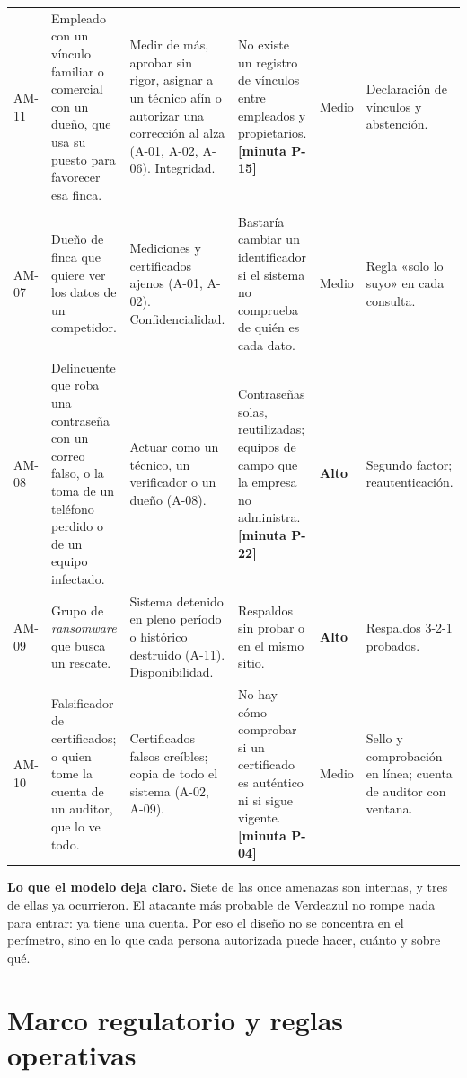\documentclass[11pt,letterpaper]{article}
\newcommand{\cab}[1]{\textbf{\rmfamily #1}}
\newcommand{\resp}[1]{\textrm{\footnotesize\bfseries [minuta #1]}}
\begin{document}
{\begin{longtable}{@{}L{1.25cm} L{3.3cm} L{3.8cm} L{3.4cm} L{1.0cm} L{2.6cm}@{}}
AM-11 & Empleado con un vínculo familiar o comercial con un dueño, que usa su puesto para favorecer esa finca. & Medir de más, aprobar sin rigor, asignar a un técnico afín o autorizar una corrección al alza (A-01, A-02, A-06). Integridad. & No existe un registro de vínculos entre empleados y propietarios. \resp{P-15} & Medio & Declaración de vínculos y abstención. \\
\addlinespace[4pt]
\multicolumn{6}{@{}l}{\cab{Amenazas externas}} \\
\addlinespace[2pt]
AM-07 & Dueño de finca que quiere ver los datos de un competidor. & Mediciones y certificados ajenos (A-01, A-02). Confidencialidad. & Bastaría cambiar un identificador si el sistema no comprueba de quién es cada dato. & Medio & Regla «solo lo suyo» en cada consulta. \\
AM-08 & Delincuente que roba una contraseña con un correo falso, o la toma de un teléfono perdido o de un equipo infectado. & Actuar como un técnico, un verificador o un dueño (A-08). & Contraseñas solas, reutilizadas; equipos de campo que la empresa no administra. \resp{P-22} & \textbf{Alto} & Segundo factor; reautenticación. \\
AM-09 & Grupo de \emph{ransomware} que busca un rescate. & Sistema detenido en pleno período o histórico destruido (A-11). Disponibilidad. & Respaldos sin probar o en el mismo sitio. & \textbf{Alto} & Respaldos 3-2-1 probados. \\
AM-10 & Falsificador de certificados; o quien tome la cuenta de un auditor, que lo ve todo. & Certificados falsos creíbles; copia de todo el sistema (A-02, A-09). & No hay cómo comprobar si un certificado es auténtico ni si sigue vigente. \resp{P-04} & Medio & Sello y comprobación en línea; cuenta de auditor con ventana. \\
\end{longtable}
}

\textbf{Lo que el modelo deja claro.} Siete de las once amenazas son internas, y tres de ellas ya
ocurrieron. El atacante más probable de Verdeazul no rompe nada para entrar: ya tiene una cuenta. Por
eso el diseño no se concentra en el perímetro, sino en lo que cada persona autorizada puede hacer,
cuánto y sobre qué.

\section{Marco regulatorio y reglas operativas}
\label{sec:legal}
\end{document}
